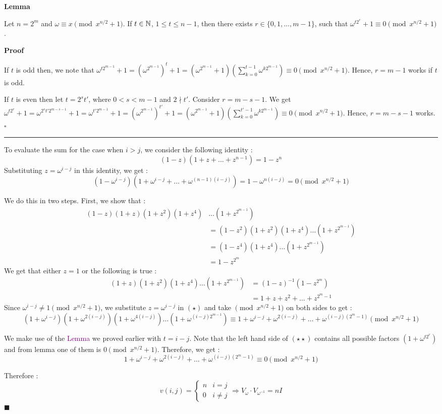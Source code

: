 \begin{thisnote}
    \textbf{Lemma}
    
    Let $n=2^m$ and $\omega \equiv x \pmod{x^{n/2}+1}$. If $t\in \mathbb{N}$, $1\leq t\leq n-1$, then there exists $r\in \{0,1,\ldots, m-1\}$, such that $\omega^{t2^r} + 1 \equiv 0 \pmod{x^{n/2}+1}$.

    \textbf{Proof}

    If $t$ is odd then, we note that $\omega^{t 2^{m-1}}+1 = (\omega^{2^{m-1}})^t + 1 = (\omega^{2^{m-1}}+1)(\sum_{k=0}^{t-1} \omega^{k2^{m-1}}) \equiv 0 \pmod{x^{n/2}+1}$. Hence, $r=m-1$ works if $t$ is odd.

    If $t$ is even then let $t=2^{s}t'$, where $0<s<m-1$ and $2\nmid t'$. Consider $r=m-s-1$. We get $\omega^{t2^r}+1 = \omega^{2^s t' 2^{m-s-1}} + 1 = \omega^{t' 2^{m-1}} + 1 = (\omega^{2^{m-1}})^{t'} + 1 = (\omega^{2^{m-1}}+1)(\sum_{k=0}^{t'-1} \omega^{k2^{m-1}}) \equiv 0 \pmod{x^{n/2}+1}$. Hence, $r=m-s-1$ works. \hfill $\square$
\end{thisnote}
\begin{center}
\rule{0.5\textwidth}{.4pt}
\end{center}
To evaluate the sum for the case when $i> j$, we consider the following identity :
\[(1-z)(1+z+\ldots+z^{n-1}) = 1-z^n\]
Substituting $z = \omega^{i-j}$ in this identity, we get :
\[(1-\omega^{i-j})(1+\omega^{i-j}+\ldots +\omega^{(n-1)(i-j)}) = 1-\omega^{n(i-j)} = 0 \pmod{x^{n/2}+1}\]

We do this in two steps. First, we show that :
\begin{align*}
    (1-z)(1+z)(1+z^2)(1+z^4)&\ldots(1+z^{2^{m-1}}) \\
    &= (1-z^2)(1+z^2)(1+z^4)\ldots(1+z^{2^{m-1}})  \\
    &= (1-z^4)(1+z^4)\ldots(1+z^{2^{m-1}}) \\
    &= 1-z^{2^m}
\end{align*}
We get that either $z=1$ or the following is true :
\begin{align*}
    (1+z)(1+z^2)(1+z^4)\ldots(1+z^{2^{m-1}}) &= (1-z)^{-1}({1-z^{2^m}}) \\
    &= 1+z+z^2+\ldots+z^{2^{m}-1} \tag{\star}
\end{align*}
Since $\omega^{i-j} \neq 1 \pmod{x^{n/2}+1}$, we substitute $z=\omega^{i-j}$ in $(\star)$ and take $\pmod{x^{n/2}+1}$ on both sides to get :
\[ (1+\omega^{i-j})(1+\omega^{2(i-j)})(1+\omega^{4(i-j)})\ldots(1+\omega^{(i-j)2^{m-1}}) \equiv 1+\omega^{i-j}+\omega^{2(i-j)}+\ldots+\omega^{(i-j)(2^{m}-1)}\pmod{x^{n/2}+1} \tag{\star\star}\]

We make use of the \textcolor{purple}{Lemma} we proved earlier with $t=i-j$. Note that the left hand side of $(\star\star)$ contains all possible factors $(1+\omega^{t2^r})$ and from lemma one of them is $0 \pmod{x^{n/2}+1}$. Therefore, we get :
\[1+\omega^{i-j}+\omega^{2(i-j)}+\ldots+\omega^{(i-j)(2^{m}-1)}\equiv 0 \pmod{x^{n/2}+1}\]

Therefore :
\[v(i,j) = \begin{cases}
                n & i=j \\
                0 & i\neq j
            \end{cases} \Rightarrow V_{\omega} \cdot V_{\omega^{-1}}= nI\] \hfill $\blacksquare$